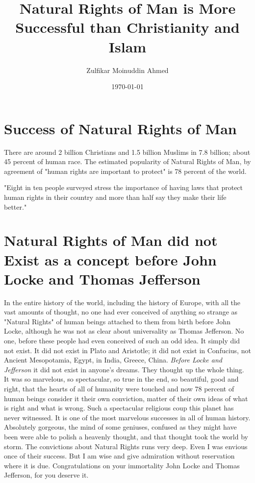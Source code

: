 \documentclass{amsart}
\title{Natural Rights of Man is More Successful than Christianity and Islam}
\author{Zulfikar Moinuddin Ahmed}
\date{\today}
\begin{document}
\maketitle

\section{Success of Natural Rights of Man}

There are around 2 billion Christians and 1.5 billion Muslims in 7.8 billion; about 45 percent of human race.  The estimated popularity of Natural Rights of Man, by agreement of "human rights are important to protect" is 78 percent of the world.  

"Eight in ten people surveyed stress the importance of having laws that protect human rights in their country and more than half say they make their life better."\cite{HR}

\section{Natural Rights of Man did not Exist as a concept before John Locke and Thomas Jefferson}

In the entire history of the world, including the history of Europe, with all the vast amounts of thought, no one had ever conceived of anything so strange as "Natural Rights" of human beings attached to them from birth before John Locke, although he was not as clear about universality as Thomas Jefferson.  No one, before these people had even conceived of such an odd idea.  It simply did not exist.  It did not exist in Plato and Aristotle; it did not exist in Confucius, not Ancient Mesopotamia, Egypt, in India, Greece, China.  {\em Before Locke and Jefferson} it did not exist in anyone's dreams. They thought up the whole thing.  It was so marvelous, so spectacular, so true in the end, so beautiful, good and right, that the hearts of all of humanity were touched and now 78 percent of human beings consider it their own conviction, matter of their own ideas of what is right and what is wrong.  Such a spectacular religious coup this planet has never witnessed.  It is one of the most marvelous successes in all of human history.  Absolutely gorgeous, the mind of some geniuses, confused as they might have been were able to polish a heavenly thought, and that thought took the world by storm.  The convictions about Natural Rights runs very deep.  Even I was envious once of their success.  But I am wise and give admiration without reservation where it is due.  Congratulations on your immortality John Locke and Thomas Jefferson, for you deserve it.



\begin{thebibliography}{CCC}
\end{thebibliography}
\end{document}
